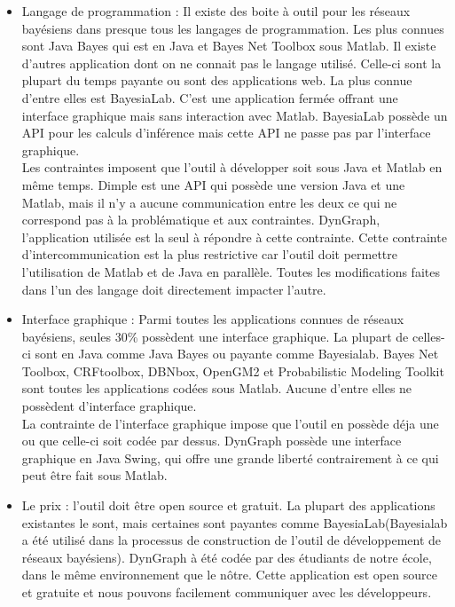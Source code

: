 \documentclass[conference]{IEEEtran}
\begin{document}
\begin{itemize}
	\item{Langage de programmation :} Il existe des boite à outil pour les réseaux bayésiens dans presque tous les langages de programmation. Les plus connues sont Java Bayes qui est en Java et Bayes Net Toolbox sous Matlab. Il existe d'autres application dont on ne connait pas le langage utilisé. Celle-ci sont la plupart du temps payante ou sont des applications web. La plus connue d'entre elles est BayesiaLab. C'est une application fermée offrant une interface graphique mais sans interaction avec Matlab. BayesiaLab possède un API pour les calculs d'inférence mais cette API ne passe pas par l'interface graphique. \\Les contraintes imposent que l'outil à développer soit sous Java et Matlab en même temps. Dimple est une API qui possède une version Java et une Matlab, mais il n'y a aucune communication entre les deux ce qui ne correspond pas à la problématique et aux contraintes. DynGraph, l'application utilisée est la seul à répondre à cette contrainte. Cette contrainte d'intercommunication est la plus restrictive car l'outil doit permettre l'utilisation de Matlab et de Java en parallèle. Toutes les modifications faites dans l'un des langage doit directement impacter l'autre. \\
	
	\item{Interface graphique :} Parmi toutes les applications connues de réseaux bayésiens, seules 30\% possèdent une interface graphique. La plupart de celles-ci sont en Java comme Java Bayes ou payante comme Bayesialab. Bayes Net Toolbox, CRFtoolbox, DBNbox, OpenGM2 et Probabilistic Modeling Toolkit sont toutes les applications codées sous Matlab. Aucune d'entre elles ne possèdent d'interface graphique.\\ 
	La contrainte de l'interface graphique impose que l'outil en possède déja une ou que celle-ci soit codée par dessus. DynGraph possède une interface graphique en Java Swing, qui offre une grande liberté contrairement à ce qui peut être fait sous Matlab. \\

	\item{Le prix :} l'outil doit être open source et gratuit. La plupart des applications  existantes le sont, mais certaines sont payantes comme BayesiaLab(Bayesialab a été utilisé dans la processus de construction de l'outil de développement de réseaux bayésiens). DynGraph à été codée par des étudiants de notre école, dans le même environnement que le nôtre. Cette application est open source et gratuite et nous pouvons facilement communiquer avec les développeurs. \\
	

\end{itemize}
\end{document}

